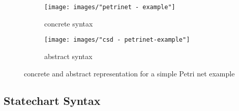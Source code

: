\begin{figure}[ht!]
  \centering
  \begin{subfigure}[t]{.4\textwidth}
    \centering
    \texttt{[image: images/"petrinet - example"]}
    \caption{concrete syntax}
    \label{subfig:petriconcrete}    
  \end{subfigure}
  \begin{subfigure}[t]{.45\textwidth}
    \centering
    \texttt{[image: images/"csd - petrinet-example"]}
    \caption{abstract syntax}
    \label{subfig:petriabstract}    
  \end{subfigure}
  \caption{concrete and abstract representation for a simple Petri net example}
  \label{fig:petrinets_example}
\end{figure} 

\subsection{Statechart Syntax}
